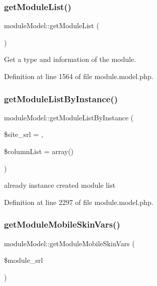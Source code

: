 \subsubsection{\texorpdfstring{get\+Module\+List()}{getModuleList()}}
{\footnotesize\ttfamily module\+Model\+::get\+Module\+List (\begin{DoxyParamCaption}{ }\end{DoxyParamCaption})}



Get a type and information of the module. 



Definition at line 1564 of file module.\+model.\+php.

\mbox{\label{classmoduleModel_a29d890e1acd36f429ff2411533104c8b}} 
\subsubsection{\texorpdfstring{get\+Module\+List\+By\+Instance()}{getModuleListByInstance()}}
{\footnotesize\ttfamily module\+Model\+::get\+Module\+List\+By\+Instance (\begin{DoxyParamCaption}\item[{}]{\$site\+\_\+srl = {},  }\item[{}]{\$column\+List = {\ttfamily array()} }\end{DoxyParamCaption})}



already instance created module list 



Definition at line 2297 of file module.\+model.\+php.

\mbox{\label{classmoduleModel_aef7f4760b4c1864752d1042e1a0667c8}} 
\subsubsection{\texorpdfstring{get\+Module\+Mobile\+Skin\+Vars()}{getModuleMobileSkinVars()}}
{\footnotesize\ttfamily module\+Model\+::get\+Module\+Mobile\+Skin\+Vars (\begin{DoxyParamCaption}\item[{}]{\$module\+\_\+srl }\end{DoxyParamCaption})}

